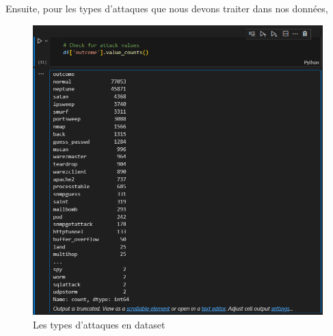 \documentclass[a4paper,12pt]{report}
\begin{document}
\noindent\normalsize Ensuite, pour les types d'attaques que nous devons traiter dans nos données,

\begin{figure}[H]
    \centering
    \includegraphics[scale=0.9]{outils-images/data2.png}
    \caption{Les types d'attaques en dataset}
    \label{fig:types_attaques}
\end{figure}
\end{document}

